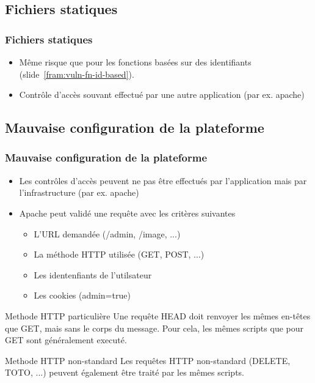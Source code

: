 \documentclass{beamer}
\begin{document}
\subsection{Fichiers statiques}
\begin{frame}
  \frametitle{Fichiers statiques}
  \begin{itemize}
    \item Même risque que pour les fonctions basées sur des identifiants (slide~\ref{fram:vuln-fn-id-based}).
    \item Contrôle d'accès souvant effectué par une autre application (par ex. apache)
  \end{itemize}
\end{frame}

\subsection{Mauvaise configuration de la plateforme}
\begin{frame}
  \frametitle{Mauvaise configuration de la plateforme}
  \begin{itemize}
    \item Les contrôles d'accès peuvent ne pas être effectués par l'application mais par l'infrastructure (par ex. apache)
    \item Apache peut validé une requête avec les critères suivantes
    \begin{itemize}
      \item L'URL demandée (/admin, /image, ...)
      \item La méthode HTTP utilisée (GET, POST, ...)
      \item Les identenfiants de l'utilsateur
      \item Les cookies (admin=true)
    \end{itemize}
  \end{itemize}
  \begin{block}{Methode HTTP particulière}
    Une requête HEAD doit renvoyer les mêmes en-têtes que GET, mais sans le corps du message. Pour cela, les mêmes scripts que pour GET sont généralement executé.
  \end{block}
  \begin{block}{Methode HTTP non-standard}
    Les requêtes HTTP non-standard (DELETE, TOTO, ...) peuvent également être traité par les mêmes scripts.
  \end{block}
\end{frame}
\end{document}
